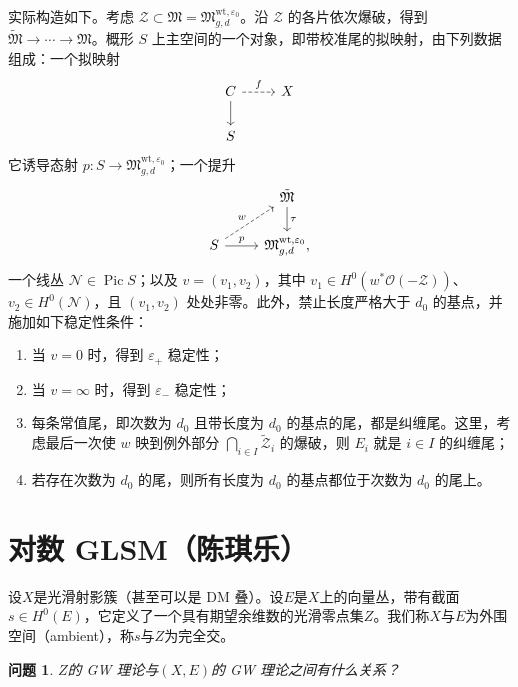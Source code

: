 \documentclass{amsart}
\newtheorem{quest}[thm]{问题}
\theoremstyle{definition}
\theoremstyle{remark}
\theoremstyle{plain}
\theoremstyle{definition}
\theoremstyle{remark}
\newcommand{\ep}{\varepsilon}
\newcommand{\mc}[1]{\mathcal{#1}}
\newcommand{\mf}[1]{\mathfrak{#1}}
\newcommand{\mr}[1]{\mathrm{#1}}
\newcommand{\1}{\mathbf{1}}
\newcommand{\2}{\mathbf{2}}
\newcommand{\3}{\mathbf{3}}
\DeclareMathOperator{\Pic}{Pic}
\begin{document}
实际构造如下。考虑 \(\mc{Z} \subset \mf{M} = \mf{M}_{g,d}^{\mr{wt}, \ep_0}\)。沿 \(\mc{Z}\) 的各片依次爆破，得到 \(\tilde{\mf{M}} \to \cdots \to \mf{M}\)。概形 \(S\) 上主空间的一个对象，即带校准尾的拟映射，由下列数据组成：一个拟映射
\begin{equation*}
\begin{tikzcd}
    C \ar{d} \ar[dashrightarrow]{r}{f} & X \\
    S
\end{tikzcd}
\end{equation*}
它诱导态射 \(p \colon S \to \mf{M}_{g,d}^{\mr{wt}, \ep_0}\)；一个提升
\begin{equation*}
\begin{tikzcd}
    & \tilde{\mf{M}} \ar{d}{\tau} \\
    S \ar{r}{p} \ar[dashrightarrow]{ur}{w} & \mf{M}_{g,d}^{\mr{wt}, \ep_0},
\end{tikzcd}
\end{equation*}
一个线丛 \(\mc{N} \in \Pic S\)；以及 \(v = (v_1, v_2)\)，其中 \(v_1 \in H^0(w^* \mc{O}(-\mc{Z}))\)、\(v_2 \in H^0(\mc{N})\)，且 \((v_1, v_2)\) 处处非零。此外，禁止长度严格大于 \(d_0\) 的基点，并施加如下稳定性条件：
\begin{enumerate}
    \item 当 \(v = 0\) 时，得到 \(\ep_+\) 稳定性；
    \item 当 \(v = \infty\) 时，得到 \(\ep_-\) 稳定性；
    \item 每条常值尾，即次数为 \(d_0\) 且带长度为 \(d_0\) 的基点的尾，都是纠缠尾。这里，考虑最后一次使 \(w\) 映到例外部分 \(\bigcap_{i \in I} \tilde{\mc{Z}}_i\) 的爆破，则 \(E_i\) 就是 \(i \in I\) 的纠缠尾；
    \item 若存在次数为 \(d_0\) 的尾，则所有长度为 \(d_0\) 的基点都位于次数为 \(d_0\) 的尾上。
\end{enumerate}







\section{对数 GLSM（陈琪乐）}%
\label{sec:Log GLSM (Qile Chen)}

设\(X\)是光滑射影簇（甚至可以是 DM 叠）。设\(E\)是\(X\)上的向量丛，带有截面\(s \in H^0(E)\)，它定义了一个具有期望余维数的光滑零点集\(Z\)。我们称\(X\)与\(E\)为外围空间（ambient），称\(s\)与\(Z\)为完全交。

\begin{quest}
    \(Z\)的 GW 理论与\((X, E)\)的 GW 理论之间有什么关系？
\end{quest}
\end{document}
